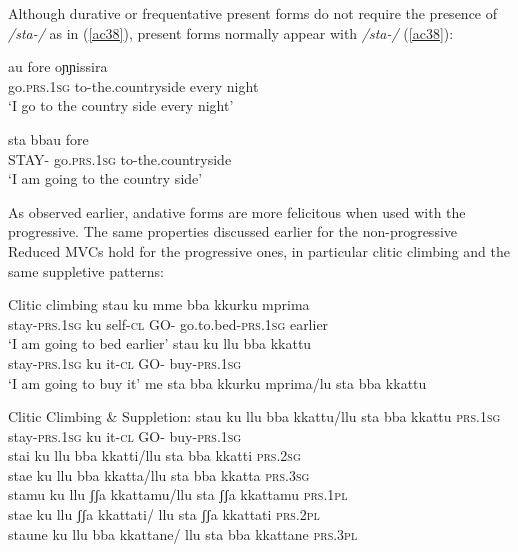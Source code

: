\documentclass[output=paper]{langscibook}
\begin{document}
\ea\label{ac37}
    \z
\z

Although durative or frequentative present forms do not require the presence of \textit{/sta-/} as in (\ref{ac38}), present forms normally appear with \textit{/sta-/} (\ref{ac38}):

\ea \label{ac38}\gll  au        fore         oɲɲissira\\
   go.\textsc{prs}.\textsc{1sg}  to-the.countryside every night\\
 \glt  ‘I go to the country side every night’
\z

\ea \label{ac39}\gll sta    bbau       fore\\
   STAY- go.\textsc{prs}.\textsc{1sg}  to-the.countryside \\
\glt   ‘I am going to the country side’
\z

As observed earlier, andative forms are more felicitous when used with the progressive. The same properties discussed earlier for the non-progressive Reduced MVCs hold for the progressive ones, in particular clitic climbing and the same suppletive patterns:

\ea \label{ac40}Clitic climbing
    \ea \label{ac40a}
        \ea \gll stau       ku  mme   bba  kkurku      mprima\\
      stay-\textsc{prs}.\textsc{1sg} ku self-\textsc{cl}  GO- go.to.bed-\textsc{prs}.\textsc{1sg} earlier\\
      \glt ‘I am going to bed earlier’
        \ex \gll stau       ku   llu   bba   kkattu\\
      stay-\textsc{prs}.\textsc{1sg}  ku   it-\textsc{cl}  GO-  buy-\textsc{prs}.\textsc{1sg}\\
      \glt ‘I am going to buy it’
        \z
    \ex \label{ac40b}me sta bba kkurku mprima/lu sta bba kkattu
    \z
\z

\ea \label{ac41}Clitic Climbing \& Suppletion:
    \ea \label{ac41a}\gll stau    ku     llu   bba  kkattu/llu sta bba kkattu \hfill \textsc{prs}.\textsc{1sg}\\
    stay-\textsc{prs}.\textsc{1sg} ku  it-\textsc{cl}  GO-  buy-\textsc{prs}.\textsc{1sg}\\
    \glt stai ku llu bba kkatti/llu sta bba kkatti  \hfill     \textsc{prs}.\textsc{2sg}\\
    stae ku llu bba kkatta/llu sta bba kkatta   \hfill    \textsc{prs}.\textsc{3sg}\\
    stamu ku llu ʃʃa kkattamu/llu sta ʃʃa kkattamu \hfill  \textsc{prs}.\textsc{1pl}\\
    stae ku llu ʃʃa kkattati/ llu sta ʃʃa kkattati  \hfill    \textsc{prs}.\textsc{2pl}\\
    staune ku llu bba kkattane/ llu sta bba kkattane \hfill \textsc{prs}.\textsc{3pl}\\
    \z
\z
\end{document}
